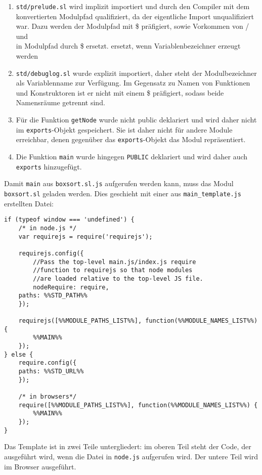 \documentclass[runningheads]{llncs}
\begin{document}
\begin{enumerate}
\item \texttt{std/prelude.sl} wird implizit importiert und durch den
    Compiler mit dem konvertierten Modulpfad qualifiziert, da der
    eigentliche Import unqualifiziert war. Dazu werden der Modulpfad
    mit \$ präfigiert, sowie Vorkommen von / und \\ in Modulpfad
    durch \$ ersetzt.
ersetzt, wenn Variablenbezeichner erzeugt werden
\item \texttt{std/debuglog.sl} wurde explizit importiert, daher steht
    der Modulbezeichner als Variablenname zur Verfügung. Im Gegensatz
    zu Namen von Funktionen und Konstruktoren ist er nicht mit einem
    \$ präfigiert, sodass beide Namensräume getrennt sind.
\item Für die Funktion \texttt{getNode} wurde nicht public deklariert
    und wird daher nicht im \texttt{exports}-Objekt gespeichert. Sie
    ist daher nicht für andere Module erreichbar, denen gegenüber das
    \texttt{exports}-Objekt das Modul repräsentiert.
\item Die Funktion \texttt{main} wurde hingegen \texttt{PUBLIC}
    deklariert und wird daher auch \texttt{exports} hinzugefügt.
\end{enumerate}

Damit \texttt{main} aus \texttt{boxsort.sl.js} aufgerufen werden kann,
muss das Modul \texttt{boxsort.sl} geladen werden. Dies geschieht mit
einer aus \texttt{main\_template.js} erstellten Datei:

\begin{verbatim}
if (typeof window === 'undefined') {
    /* in node.js */
    var requirejs = require('requirejs');
    
    requirejs.config({
        //Pass the top-level main.js/index.js require
        //function to requirejs so that node modules
        //are loaded relative to the top-level JS file.
        nodeRequire: require,
	paths: %%STD_PATH%%
    });
    
    requirejs([%%MODULE_PATHS_LIST%%], function(%%MODULE_NAMES_LIST%%) {
        %%MAIN%%
    });
} else {
    require.config({
	paths: %%STD_URL%%
    });

    /* in browsers*/ 
    require([%%MODULE_PATHS_LIST%%], function(%%MODULE_NAMES_LIST%%) {
        %%MAIN%%
    });
}
\end{verbatim}

Das Template ist in zwei Teile untergliedert: im oberen Teil steht
der Code, der ausgeführt wird, wenn die Datei in \texttt{node.js}
aufgerufen wird. Der untere Teil wird im Browser ausgeführt.
\end{document}
